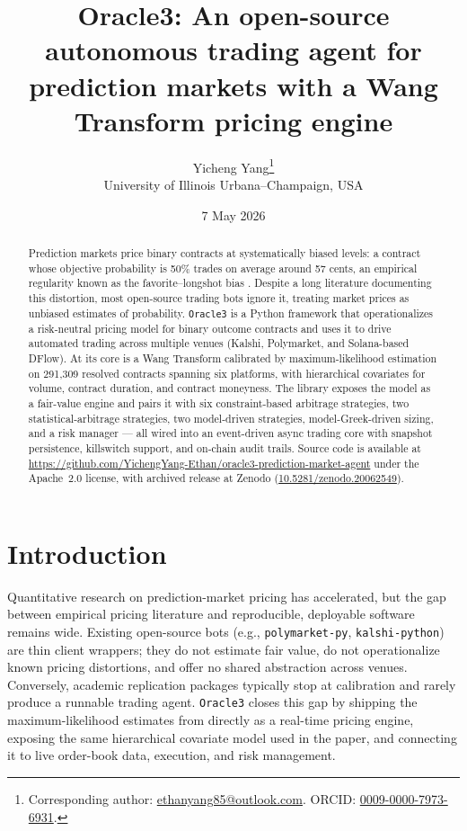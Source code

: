 \documentclass[11pt,a4paper]{article}
\title{Oracle3: An open-source autonomous trading agent for prediction markets
       with a Wang Transform pricing engine}
\author{%
  Yicheng Yang\thanks{Corresponding author: \href{mailto:ethanyang85@outlook.com}{ethanyang85@outlook.com}. ORCID: \href{https://orcid.org/0009-0000-7973-6931}{0009-0000-7973-6931}.}\\
  University of Illinois Urbana--Champaign, USA
}
\date{7 May 2026}
\begin{document}
\maketitle

\begin{abstract}
Prediction markets price binary contracts at systematically biased levels: a
contract whose objective probability is 50\% trades on average around 57 cents,
an empirical regularity known as the favorite--longshot bias
\citep{thaler:1988}. Despite a long literature documenting this distortion,
most open-source trading bots ignore it, treating market prices as unbiased
estimates of probability. \texttt{Oracle3} is a Python framework that
operationalizes a risk-neutral pricing model for binary outcome
contracts and uses it to drive automated trading across multiple venues
(Kalshi, Polymarket, and Solana-based DFlow). At its core is a Wang Transform
\citep{wang:2000,wang:2002} calibrated by maximum-likelihood estimation on
291{,}309 resolved contracts spanning six platforms, with hierarchical
covariates for volume, contract duration, and contract moneyness. The library
exposes the model as a fair-value engine and pairs it with six
constraint-based arbitrage strategies, two statistical-arbitrage strategies,
two model-driven strategies, model-Greek-driven sizing, and a risk manager ---
all wired into an event-driven async trading core with snapshot persistence,
killswitch support, and on-chain audit trails. Source code is available at
\url{https://github.com/YichengYang-Ethan/oracle3-prediction-market-agent} under the Apache~2.0 license,
with archived release at Zenodo (\href{https://doi.org/10.5281/zenodo.20062549}{10.5281/zenodo.20062549}).
\end{abstract}

\section{Introduction}
\label{sec:intro}

Quantitative research on prediction-market pricing has accelerated, but the gap
between empirical pricing literature and reproducible, deployable software
remains wide. Existing open-source bots (e.g., \texttt{polymarket-py},
\texttt{kalshi-python}) are thin client wrappers; they do not estimate fair
value, do not operationalize known pricing distortions, and offer no shared
abstraction across venues. Conversely, academic replication packages typically
stop at calibration and rarely produce a runnable trading agent.
\texttt{Oracle3} closes this gap by shipping the maximum-likelihood estimates
from \citet{yang:2026} directly as a real-time pricing engine, exposing the
same hierarchical covariate model used in the paper, and connecting it to live
order-book data, execution, and risk management.
\end{document}
